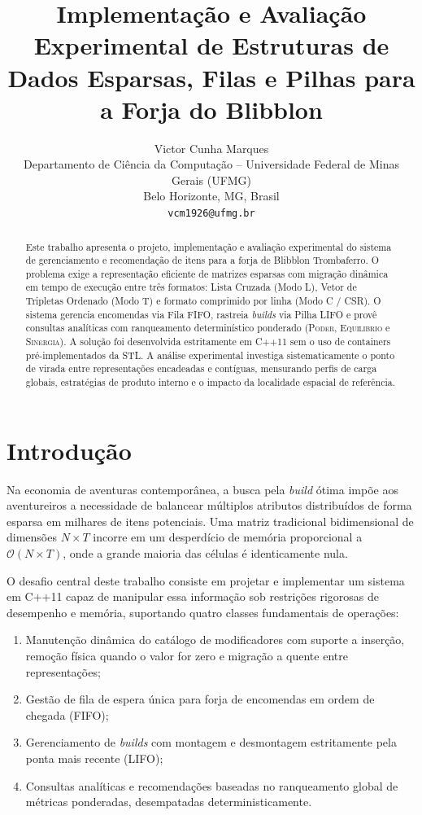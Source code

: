 \documentclass[letterpaper]{article}
\title{Implementação e Avaliação Experimental de Estruturas de Dados Esparsas, Filas e Pilhas para a Forja do Blibblon}
\author{
    Victor Cunha Marques\\
    Departamento de Ciência da Computação -- Universidade Federal de Minas Gerais (UFMG)\\
    Belo Horizonte, MG, Brasil\\
    \texttt{vcm1926@ufmg.br}
}
\begin{document}
\maketitle

\begin{abstract}
Este trabalho apresenta o projeto, implementação e avaliação experimental do sistema de gerenciamento e recomendação de itens para a forja de Blibblon Trombaferro. O problema exige a representação eficiente de matrizes esparsas com migração dinâmica em tempo de execução entre três formatos: Lista Cruzada (Modo L), Vetor de Tripletas Ordenado (Modo T) e formato comprimido por linha (Modo C / CSR). O sistema gerencia encomendas via Fila FIFO, rastreia \textit{builds} via Pilha LIFO e provê consultas analíticas com ranqueamento determinístico ponderado (\textsc{Poder}, \textsc{Equilibrio} e \textsc{Sinergia}). A solução foi desenvolvida estritamente em C++11 sem o uso de containers pré-implementados da STL. A análise experimental investiga sistematicamente o ponto de virada entre representações encadeadas e contíguas, mensurando perfis de carga globais, estratégias de produto interno e o impacto da localidade espacial de referência.
\end{abstract}

\section{Introdução}
Na economia de aventuras contemporânea, a busca pela \textit{build} ótima impõe aos aventureiros a necessidade de balancear múltiplos atributos distribuídos de forma esparsa em milhares de itens potenciais. Uma matriz tradicional bidimensional de dimensões $N \times T$ incorre em um desperdício de memória proporcional a $\mathcal{O}(N \times T)$, onde a grande maioria das células é identicamente nula.

O desafio central deste trabalho consiste em projetar e implementar um sistema em C++11 capaz de manipular essa informação sob restrições rigorosas de desempenho e memória, suportando quatro classes fundamentais de operações:
\begin{enumerate}
    \item Manutenção dinâmica do catálogo de modificadores com suporte a inserção, remoção física quando o valor for zero e migração a quente entre representações;
    \item Gestão de fila de espera única para forja de encomendas em ordem de chegada (FIFO);
    \item Gerenciamento de \textit{builds} com montagem e desmontagem estritamente pela ponta mais recente (LIFO);
    \item Consultas analíticas e recomendações baseadas no ranqueamento global de métricas ponderadas, desempatadas deterministicamente.
\end{enumerate}
\end{document}
